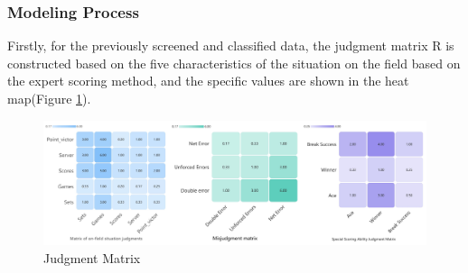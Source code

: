 \subsubsection{Modeling Process}
Firstly, for the previously screened and classified data, the judgment matrix R is constructed based on the five characteristics of the situation on the field based on the expert scoring method, and the specific values are shown in the heat map(Figure \ref{fig:JM}).
\begin{figure}[bt!]
    \centering
    \includegraphics[width=1\linewidth]{figure/Heat Map.jpg}
    \caption{\centering Judgment Matrix}
    \label{fig:JM}
\end{figure}


